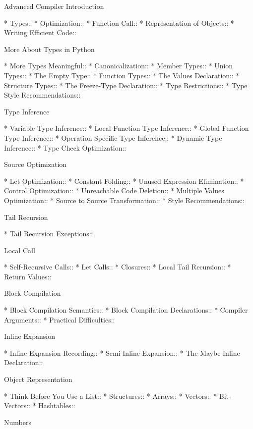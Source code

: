\begin{menu}
Advanced Compiler Introduction

* Types::                       
* Optimization::                
* Function Call::               
* Representation of Objects::   
* Writing Efficient Code::      

More About Types in Python

* More Types Meaningful::       
* Canonicalization::            
* Member Types::                
* Union Types::                 
* The Empty Type::              
* Function Types::              
* The Values Declaration::      
* Structure Types::             
* The Freeze-Type Declaration::  
* Type Restrictions::           
* Type Style Recommendations::  

Type Inference

* Variable Type Inference::     
* Local Function Type Inference::  
* Global Function Type Inference::  
* Operation Specific Type Inference::  
* Dynamic Type Inference::      
* Type Check Optimization::     

Source Optimization

* Let Optimization::            
* Constant Folding::            
* Unused Expression Elimination::  
* Control Optimization::        
* Unreachable Code Deletion::   
* Multiple Values Optimization::  
* Source to Source Transformation::  
* Style Recommendations::       

Tail Recursion

* Tail Recursion Exceptions::   

Local Call

* Self-Recursive Calls::        
* Let Calls::                   
* Closures::                    
* Local Tail Recursion::        
* Return Values::               

Block Compilation

* Block Compilation Semantics::  
* Block Compilation Declarations::  
* Compiler Arguments::          
* Practical Difficulties::      

Inline Expansion

* Inline Expansion Recording::  
* Semi-Inline Expansion::       
* The Maybe-Inline Declaration::  

Object Representation

* Think Before You Use a List::  
* Structures::                  
* Arrays::                      
* Vectors::                     
* Bit-Vectors::                 
* Hashtables::                  

Numbers


\end{menu}
